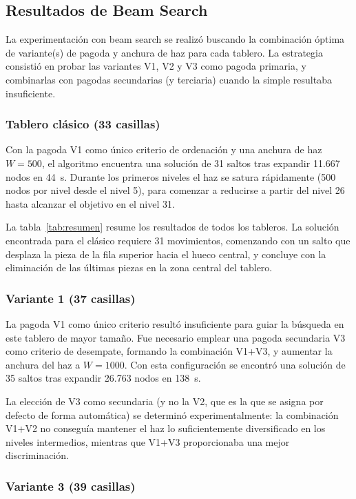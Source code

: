 \documentclass[conference,a4paper]{IEEEtran}
\begin{document}
\subsection{Resultados de Beam Search}

La experimentación con beam search se realizó buscando la combinación óptima
de variante(s) de pagoda y anchura de haz para cada tablero. La estrategia
consistió en probar las variantes V1, V2 y V3 como pagoda primaria, y
combinarlas con pagodas secundarias (y terciaria) cuando la simple resultaba
insuficiente.

\subsubsection{Tablero clásico (33 casillas)}

Con la pagoda V1 como único criterio de ordenación y una anchura de haz
$W=500$, el algoritmo encuentra una solución de 31 saltos tras expandir
11.667 nodos en 44~s. Durante los primeros niveles el haz se satura
rápidamente (500 nodos por nivel desde el nivel 5), para comenzar a reducirse
a partir del nivel 26 hasta alcanzar el objetivo en el nivel 31.

La tabla~\ref{tab:resumen} resume los resultados de todos los tableros. La
solución encontrada para el clásico requiere 31 movimientos, comenzando con
un salto que desplaza la pieza de la fila superior hacia el hueco central,
y concluye con la eliminación de las últimas piezas en la zona central del
tablero.

\subsubsection{Variante 1 (37 casillas)}

La pagoda V1 como único criterio resultó insuficiente para guiar la búsqueda
en este tablero de mayor tamaño. Fue necesario emplear una pagoda secundaria
V3 como criterio de desempate, formando la combinación V1+V3, y aumentar la
anchura del haz a $W=1000$. Con esta configuración se encontró una solución
de 35 saltos tras expandir 26.763 nodos en 138~s.

La elección de V3 como secundaria (y no la V2, que es la que se asigna por
defecto de forma automática) se determinó experimentalmente: la combinación
V1+V2 no conseguía mantener el haz lo suficientemente diversificado en los
niveles intermedios, mientras que V1+V3 proporcionaba una mejor
discriminación.

\subsubsection{Variante 3 (39 casillas)}
\end{document}
